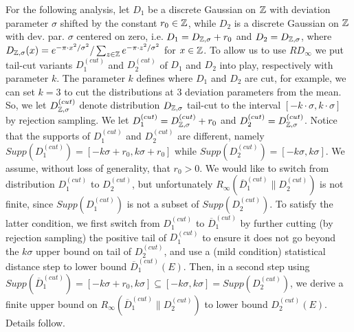 For the following analysis, let $D_1$ be a discrete Gaussian on $\mathbb{Z}$ with
deviation parameter $\sigma$ shifted by the constant $r_0 \in \mathbb{Z}$, while $D_2$
is a discrete Gaussian on $\mathbb{Z}$ with dev. par. $\sigma$ centered on zero,
i.e. $D_1 = D_{\mathbb{Z},\sigma} + r_0$ and $D_2 = D_{\mathbb{Z},\sigma}$, where
$D_{\mathbb{Z},\sigma}(x) = e^{-\pi \cdot x^2/\sigma^2}/\sum_{z \in \mathbb{Z}} e^{-\pi \cdot
  z^2/\sigma^2}$ for $x \in \mathbb{Z}$. To allow us to use $RD_{\infty}$ we put
tail-cut variants $D_1^{(cut)}$ and $D_2^{(cut)}$ of $D_1$ and $D_2$ into play,
respectively with parameter $k$. The parameter $k$ defines where $D_1$ and $D_2$
are cut, for example, we can set $k=3$ to cut the distributions at 3
deviation parameters from the mean. So, we let $D_{\mathbb{Z},\sigma}^{(cut)}$ denote
distribution $D_{\mathbb{Z},\sigma}$ tail-cut to the interval
$[-k \cdot \sigma, k \cdot \sigma]$ by rejection sampling. We let
$D_1^{(cut)} = D_{\mathbb{Z},\sigma}^{(cut)} + r_0$ and
$D_2^{(cut)} = D_{\mathbb{Z},\sigma}^{(cut)}$. Notice that the supports of
$D_1^{(cut)}$ and $D_2^{(cut)}$ are different, namely
$Supp(D_1^{(cut)}) = [-k\sigma+r_0,k\sigma+r_0]$ while
$Supp(D_2^{(cut)}) = [-k\sigma,k\sigma]$. We assume, without loss of generality,
that $r_0 > 0$. We would like to switch from distribution $D_1^{(cut)}$ to
$D_2^{(cut)}$, but unfortunately $R_\infty(\overline{D}_1^{(cut)}\|D_2^{(cut)})$
is not finite, since $Supp(D_1^{(cut)})$ is not a subset of
$Supp(D_2^{(cut)})$. To satisfy the latter condition, we first switch from
$D_1^{(cut)}$ to $\overline{D}_1^{(cut)}$ by further cutting (by rejection
sampling) the positive tail of $D_1^{(cut)}$ to ensure it does not go beyond the
$k \sigma$ upper bound on tail of $D_2^{(cut)}$, and use a (mild condition)
statistical distance step to lower bound $\overline{D}_1^{(cut)}(E)$. Then, in a
second step using
$Supp(\overline{D}_1^{(cut)})=[-k\sigma+r_0, k\sigma] \subseteq
[-k\sigma,k\sigma] = Supp(D_2^{(cut)})$, we derive a finite upper bound on
$R_\infty(\overline{D}_1^{(cut)}\|D_2^{(cut)})$ to lower bound
$D_2^{(cut)}(E)$. Details follow.
